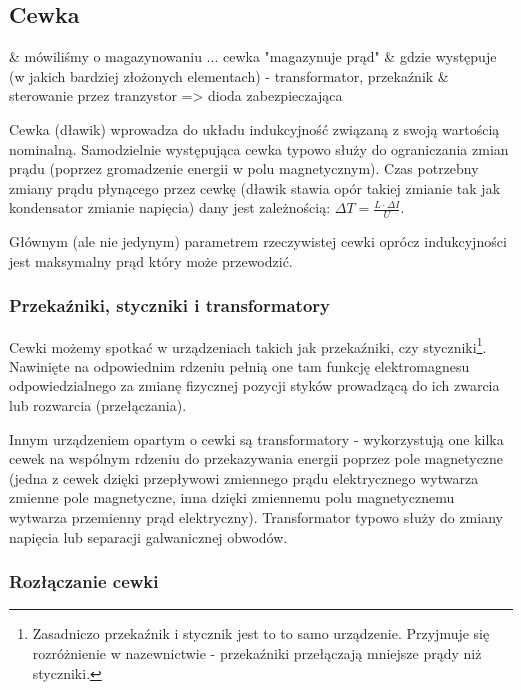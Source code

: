 \documentclass{pdfBooklets}
\begin{document}
\subsection{Cewka}
\begin{teacherOnly}
	\begin{easylist}[itemize]
		& mówiliśmy o magazynowaniu ... cewka "magazynuje prąd"
		& gdzie występuje (w jakich bardziej złożonych elementach) - transformator, przekaźnik
		& sterowanie przez tranzystor => dioda zabezpieczająca
	\end{easylist}
\end{teacherOnly}

Cewka (dławik) wprowadza do układu indukcyjność związaną z swoją wartością nominalną. Samodzielnie występująca cewka typowo służy do ograniczania zmian prądu (poprzez gromadzenie energii w polu magnetycznym). Czas potrzebny zmiany prądu płynącego przez cewkę (dławik stawia opór takiej zmianie tak jak kondensator zmianie napięcia) dany jest zależnością: $\Delta T = \frac{L \cdot \Delta I}{U}$.

Głównym (ale nie jedynym) parametrem rzeczywistej cewki oprócz indukcyjności jest maksymalny prąd który może przewodzić.

\subsubsection{Przekaźniki, styczniki i transformatory}

Cewki możemy spotkać w urządzeniach takich jak przekaźniki, czy styczniki\footnote{Zasadniczo przekaźnik i stycznik jest to to samo urządzenie. Przyjmuje się rozróżnienie w nazewnictwie - przekaźniki przełączają mniejsze prądy niż styczniki.}.
Nawinięte na odpowiednim rdzeniu pełnią one tam funkcję elektromagnesu odpowiedzialnego za zmianę fizycznej pozycji styków prowadzącą do ich zwarcia lub rozwarcia (przełączania).

Innym urządzeniem opartym o cewki są transformatory - wykorzystują one kilka cewek na wspólnym rdzeniu do przekazywania energii poprzez pole magnetyczne (jedna z cewek dzięki przepływowi zmiennego prądu elektrycznego wytwarza zmienne pole magnetyczne, inna dzięki zmiennemu polu magnetycznemu wytwarza przemienny prąd elektryczny). Transformator typowo służy do zmiany napięcia lub separacji galwanicznej obwodów.

\subsubsection{Rozłączanie cewki}
\end{document}
